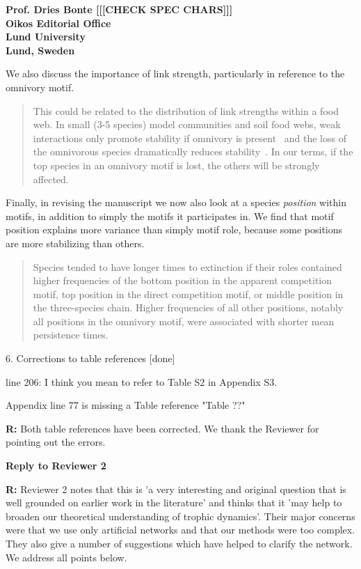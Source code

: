 \documentclass[12pt]{letter}
\begin{document}
\begin{letter}{\bf Prof. Dries Bonte [[[CHECK SPEC CHARS]]]\\
Oikos Editorial Office \\
Lund University \\
Lund, Sweden}
\begin{quotation}
    \end{quotation}
    
    We also discuss the importance of link strength, particularly in reference to the omnivory motif.
    
    \begin{quotation}
        This could be related to the distribution of link strengths within a food web.
        In small (3-5 species) model communities and soil food webs, weak interactions only promote stability if omnivory is present~\citep{Neutel2002,Emmerson2004} and the loss of the omnivorous species dramatically reduces stability~\citep{Emmerson2004}.
        In our terms, if the top species in an omnivory motif is lost, the others will be strongly affected.

    \end{quotation}
    
    Finally, in revising the manuscript we now also look at a species \emph{position} within motifs, in addition to simply the motifs it participates in. We find that motif position explains more variance than simply motif role, because some positions are more stabilizing than others.
    
    \begin{quotation}
        Species tended to have longer times to extinction if their roles contained higher frequencies of the bottom position in the apparent competition motif, top position in the direct competition motif, or middle position in the three-species chain.
        Higher frequencies of all other positions, notably all positions in the omnivory motif, were associated with shorter mean persistence times.

    \end{quotation}


  6. Corrections to table references [done]

    line 206: I think you mean to refer to Table S2 in Appendix S3.

    Appendix line 77 is missing a Table reference "Table ??"

    \textbf{R:} Both table references have been corrected. We thank the Reviewer for pointing out the errors.


\clearpage

\Large{\textbf{Reply to Reviewer 2}}

\textbf{R:} Reviewer 2 notes that this is 'a very interesting and original question that is well grounded on earlier work in the literature' and thinks that it 'may help to broaden our theoretical understanding of trophic dynamics'. Their major concerns were that we use only artificial networks and that our methods were too complex. They also give a number of suggestions which have helped to clarify the network. We address all points below.


\end{letter}
\end{document}
